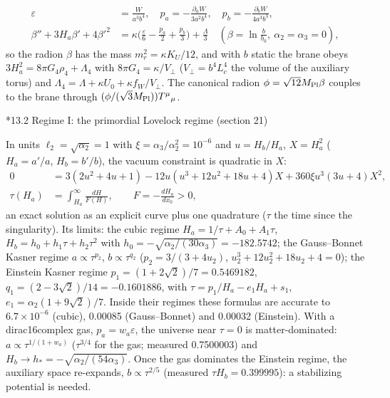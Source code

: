 \documentclass[10pt,a4paper]{article}
\makeatletter
\renewcommand\subsection{\@startsection{subsection}{2}{\z@}{-3.25ex\@plus -1ex \@minus -.2ex}{1.5ex \@plus .2ex}{\normalfont\large\bfseries\raggedright}}
\makeatother
\begin{document}
\begin{align*}
\varepsilon&=\frac W{a^3b^4},\quad p_a=-\frac{\partial_aW}{3a^2b^4},\quad p_b=-\frac{\partial_bW}{4a^3b^3}, \\
\beta''+3H_a\beta'+4\beta'^2&=\kappa\Big(\frac\varepsilon6-\frac{p_a}2+\frac{p_b}3\Big)+\frac\Lambda3\quad(\beta=\ln\tfrac b{b_0},\ \alpha_2=\alpha_3=0),
\end{align*}
so the radion $\beta$ has the mass $m_r^2=\kappa K_U/12$, and with $b$ static the brane obeys $3H_a^2=8\pi G_4\rho_4+\Lambda_4$ with $8\pi G_4=\kappa/V_\perp$ ($V_\perp=b^4L_c^4$ the volume of the auxiliary torus) and $\Lambda_4=\Lambda+\kappa U_0+\kappa f_W/V_\perp$. The canonical radion $\phi=\sqrt{12}M_{\rm Pl}\beta$ couples to the brane through $(\phi/(\sqrt3M_{\rm Pl}))T^\mu{}_\mu$.

\subsection*{13.2 Regime I: the primordial Lovelock regime (section 21)}
In units $\ell_2=\sqrt{\alpha_2}=1$ with $\xi=\alpha_3/\alpha_2^2=10^{-6}$ and $u=H_b/H_a$, $X=H_a^2$ ($H_a=a'/a$, $H_b=b'/b$), the vacuum constraint is quadratic in $X$:
\begin{align*}
0&=3(2u^2+4u+1)-12u(u^3+12u^2+18u+4)X+360\xi u^3(3u+4)X^2, \\
\tau(H_a)&=\int_{H_a}^\infty\frac{dH}{F(H)},\qquad F=-\frac{dH_a}{dx_0}>0,
\end{align*}
an exact solution as an explicit curve plus one quadrature ($\tau$ the time since the singularity). Its limits: the cubic regime $H_a=1/\tau+A_0+A_1\tau$, $H_b=h_0+h_1\tau+h_2\tau^2$ with $h_0=-\sqrt{\alpha_2/(30\alpha_3)}=-182.5742$; the Gauss–Bonnet Kasner regime $a\propto\tau^{p_2}$, $b\propto\tau^{q_2}$ ($p_2=3/(3+4u_2)$, $u_2^3+12u_2^2+18u_2+4=0$); the Einstein Kasner regime $p_1=(1+2\sqrt2)/7=0.5469182$, $q_1=(2-3\sqrt2)/14=-0.1601886$, with $\tau=p_1/H_a-e_1H_a+s_1$, $e_1=\alpha_2(1+9\sqrt2)/7$. Inside their regimes these formulas are accurate to $6.7\times10^{-6}$ (cubic), 0.00085 (Gauss–Bonnet) and 0.00032 (Einstein). With a dirac16complex gas, $p_a=w_a\varepsilon$, the universe near $\tau=0$ is matter-dominated: $a\propto\tau^{1/(1+w_a)}$ ($\tau^{3/4}$ for the gas; measured 0.7500003) and $H_b\to h_*=-\sqrt{\alpha_2/(54\alpha_3)}$. Once the gas dominates the Einstein regime, the auxiliary space re-expands, $b\propto\tau^{2/5}$ (measured $\tau H_b=0.399995$): a stabilizing potential is needed.
\end{document}
